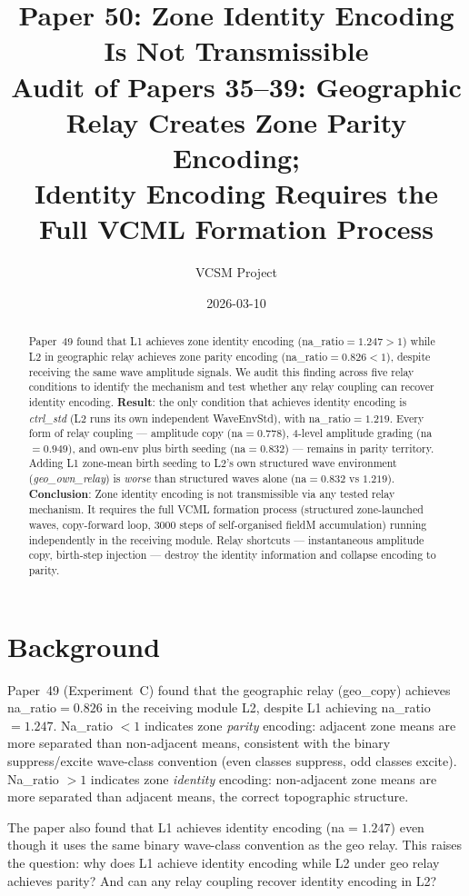 \documentclass[11pt,a4paper]{article}
\title{\textbf{Paper 50: Zone Identity Encoding Is Not Transmissible}\\
\large Audit of Papers 35--39: Geographic Relay Creates Zone Parity Encoding;\\
Identity Encoding Requires the Full VCML Formation Process}
\author{VCSM Project}
\date{2026-03-10}
\begin{document}
\maketitle

\begin{abstract}
Paper~49 found that L1 achieves zone identity encoding (na\_ratio$=1.247 > 1$) while
L2 in geographic relay achieves zone parity encoding (na\_ratio$=0.826 < 1$), despite
receiving the same wave amplitude signals.
We audit this finding across five relay conditions to identify the mechanism and
test whether any relay coupling can recover identity encoding.
\textbf{Result}: the only condition that achieves identity encoding is
\emph{ctrl\_std} (L2 runs its own independent WaveEnvStd), with na\_ratio$=1.219$.
Every form of relay coupling --- amplitude copy (na$=0.778$), 4-level amplitude
grading (na$=0.949$), and own-env plus birth seeding (na$=0.832$) --- remains in parity territory.
Adding L1 zone-mean birth seeding to L2's own structured wave environment
(\emph{geo\_own\_relay}) is \emph{worse} than structured waves alone (na$=0.832$ vs $1.219$).
\textbf{Conclusion}: Zone identity encoding is not transmissible via any tested relay
mechanism.
It requires the full VCML formation process (structured zone-launched waves, copy-forward
loop, 3000 steps of self-organised fieldM accumulation) running independently in the
receiving module.
Relay shortcuts --- instantaneous amplitude copy, birth-step injection ---
destroy the identity information and collapse encoding to parity.
\end{abstract}

\section{Background}

Paper~49 (Experiment~C) found that the geographic relay (geo\_copy) achieves
na\_ratio$=0.826$ in the receiving module L2, despite L1 achieving na\_ratio$=1.247$.
Na\_ratio $< 1$ indicates zone \emph{parity} encoding: adjacent zone means are
more separated than non-adjacent means, consistent with the binary suppress/excite
wave-class convention (even classes suppress, odd classes excite).
Na\_ratio $> 1$ indicates zone \emph{identity} encoding: non-adjacent zone means
are more separated than adjacent means, the correct topographic structure.

The paper also found that L1 achieves identity encoding (na$=1.247$) even though
it uses the same binary wave-class convention as the geo relay.
This raises the question: why does L1 achieve identity encoding while L2 under
geo relay achieves parity?
And can any relay coupling recover identity encoding in L2?
\end{document}
